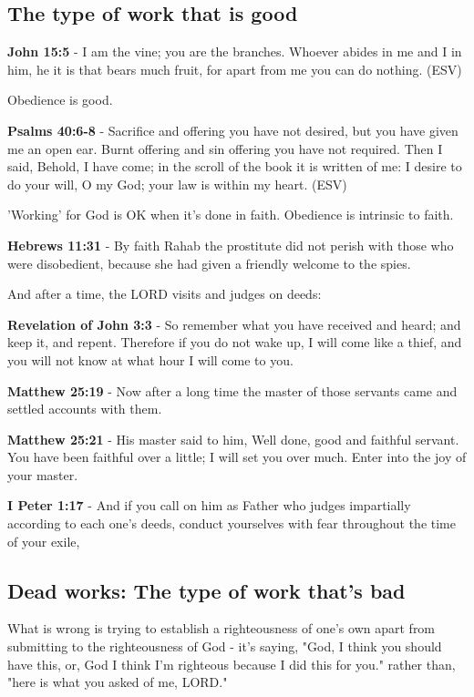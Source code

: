 \documentclass[11pt]{article}
\begin{document}
\subsection{The type of work that is good}
\label{sec:org16cca12}
\textbf{John 15:5} - I am the vine; you are the branches. Whoever abides in me and I in him, he it is that bears much fruit, for apart from me you can do nothing. (ESV)

Obedience is good.

\textbf{Psalms 40:6-8} - Sacrifice and offering you have not desired, but you have given me an open ear. Burnt offering and sin offering you have not required. Then I said, Behold, I have come; in the scroll of the book it is written of me: I desire to do your will, O my God; your law is within my heart. (ESV)

'Working' for God is OK when it's done in faith.
Obedience is intrinsic to faith.

\textbf{Hebrews 11:31} - By faith Rahab the prostitute did not perish with those who were disobedient, because she had given a friendly welcome to the spies.

And after a time, the LORD visits and judges on deeds:

\textbf{Revelation of John 3:3} - So remember what you have received and heard; and keep it, and repent. Therefore if you do not wake up, I will come like a thief, and you will not know at what hour I will come to you.

\textbf{Matthew 25:19} - Now after a long time the master of those servants came and settled accounts with them.

\textbf{Matthew 25:21} - His master said to him, Well done, good and faithful servant. You have been faithful over a little; I will set you over much. Enter into the joy of your master.

\textbf{I Peter 1:17} - And if you call on him as Father who judges impartially according to each one's deeds, conduct yourselves with fear throughout the time of your exile,

\subsection{Dead works: The type of work that's bad}
\label{sec:org9824287}
What is wrong is trying to establish a righteousness of one's own apart from submitting to the righteousness of God - it's saying, "God, I think you should have this, or, God I think I'm righteous because I did this for you." rather than, "here is what you asked of me, LORD."
\end{document}
